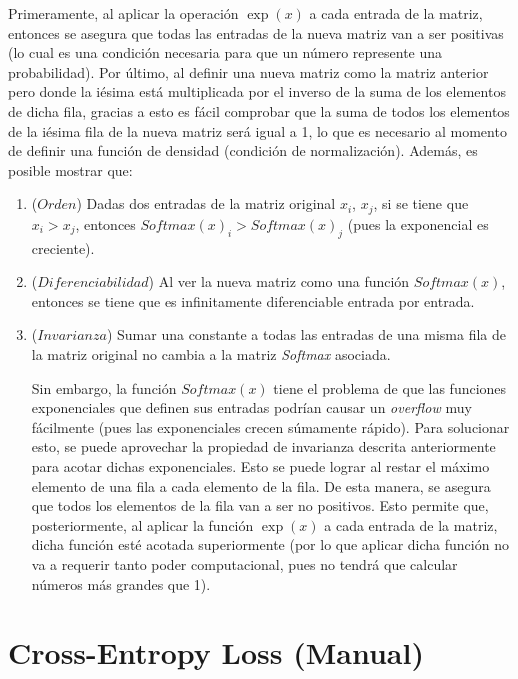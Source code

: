 \documentclass[12pt, letterpaper]{article}
\begin{document}
Primeramente, al aplicar la operación $\exp(x)$ a cada entrada de la matriz, entonces se asegura que todas las entradas de la nueva matriz van a ser positivas (lo cual es una condición necesaria para que un número represente una probabilidad). Por último, al definir una nueva matriz 
como la matriz anterior pero donde la iésima está multiplicada por el inverso de la suma de los elementos de dicha fila, gracias a esto es fácil comprobar que la suma de todos los elementos de la iésima fila de la nueva matriz será igual a 1, lo que es necesario al momento de definir una función de densidad (condición de normalización).
Además, es posible mostrar que: \begin{enumerate}
    \item ($Orden$) Dadas dos entradas de la matriz original $x_i$, $x_j$, si se tiene que $x_i > x_j$, entonces $\textit{Softmax}(x)_i>\textit{Softmax}(x)_j$ (pues la exponencial es creciente). 
    \item ($Diferenciabilidad$) Al ver la nueva matriz como una función $\textit{Softmax}(x)$, entonces se tiene que es infinitamente diferenciable entrada por entrada.
    \item ($Invarianza$) Sumar una constante a todas las entradas de una misma fila de la matriz original no cambia a la matriz \textit{Softmax} asociada.

Sin embargo, la función $\textit{Softmax}(x)$ tiene el problema de que las funciones exponenciales que definen sus entradas podrían causar un \textit{overflow} muy fácilmente (pues las exponenciales crecen súmamente rápido). Para solucionar esto, se puede aprovechar la propiedad de 
invarianza descrita anteriormente para acotar dichas exponenciales. Esto se puede lograr al restar el máximo elemento de una fila a cada elemento de la fila. De esta manera, se asegura que todos los elementos de la fila van a ser no positivos. Esto permite que, 
posteriormente, al aplicar la función $\exp(x)$ a cada entrada de la matriz, dicha función esté acotada 
superiormente (por lo que aplicar dicha función no va a requerir tanto poder computacional, pues no tendrá que 
calcular números más grandes que 1). 
\end{enumerate}





\newpage

\section{Cross-Entropy Loss (Manual)}
\end{document}
